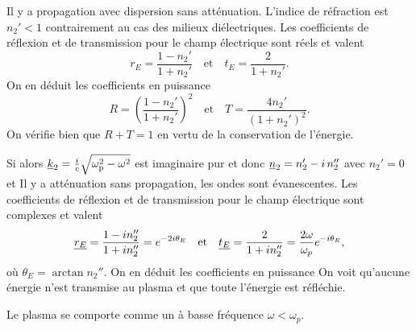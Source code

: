 \documentclass[12pt,fancy]{cours}%
\begin{document}
\begin{liste}
Il y a propagation avec dispersion sans atténuation. L'indice de réfraction est $n_2' < 1$ contrairement au cas des milieux diélectriques. Les coefficients de réflexion et de transmission pour le champ électrique sont réels et valent
\begin{equation}
  r_{E}=\frac{1- n_2'}{1 + n_2'}\quad\text{et}\quad t_{E}=\frac{2}{1+n_2'}.
  \end{equation}
On en déduit les coefficients en puissance
\begin{equation}
R=\left(\frac{1- n_2'}{1 + n_2'}\right)^2\quad \text{et}\quad T=\frac{4n_2'}{\left(1+n_2'\right)^2}.
\end{equation}
On vérifie bien que $R+T=1$ en vertu de la conservation de l'énergie.
\item Si  alors $\underline{k}_2=\frac{i}{c}\sqrt{\omega_{\rm{p}}^2-\omega^2}$ est imaginaire pur et donc  $\underline{n}_2=n_2'-i\,n_2''$ avec $n_2'=0$ et 
Il y a atténuation sans propagation, les ondes sont évanescentes. Les coefficients de réflexion et de transmission pour le champ électrique sont complexes et valent
\begin{equation}
\underline{r_{E}}=\frac{1-in_2''}{1+in_2''} = e^{- 2i\theta_E}\quad\text{et}\quad \underline{t_{E}}=\frac{2}{1+in_2''} = \frac{2\omega}{\omega_p}e^{-i\theta_E},
\end{equation}
où $\theta_E = \arctan n_2''$.
On en déduit les coefficients en puissance
On voit qu'aucune énergie n'est transmise au plasma et que toute l’énergie est réfléchie.
\begin{prop}\label{prop:}
  Le plasma se comporte comme un  à basse fréquence $\omega < \omega_p$.
\end{prop}
\end{liste}
\end{document}
